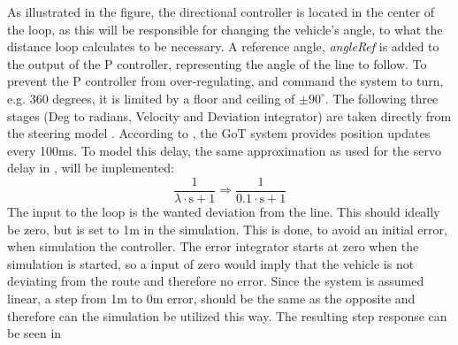 As illustrated in the figure, the directional controller is located in the center of the loop, as this will be responsible for changing the vehicle's angle, to what the distance loop calculates to be necessary. A reference angle, \emph{angleRef} is added to the output of the P controller, representing the angle of the line to follow. To prevent the P controller from over-regulating, and command the system to turn, e.g. 360 degrees, it is limited by a floor and ceiling of $\pm 90^\circ$. The following three stages (Deg to radians, Velocity and Deviation integrator) are taken directly from the steering model .
\newpage
According to , the GoT system provides position updates every 100ms. To model this delay, the same approximation as used for the servo delay in , will be implemented:
$$\frac{1}{\lambda\cdot\text{s}+1}\Rightarrow\frac{1}{\SI{0,1}\cdot\text{s}+1}
$$
The input to the loop is the wanted deviation from the line. This should ideally be zero, but is set to 1m in the simulation. This is done, to avoid an initial error, when simulation the controller. The error integrator starts at zero when the simulation is started, so a input of zero would imply that the vehicle is not deviating from the route and therefore no error. Since the system is assumed linear, a step from 1m to 0m error, should be the same as the opposite and therefore can the simulation be utilized this way. The resulting step response can be seen in 

